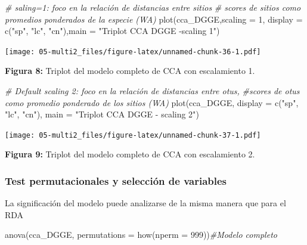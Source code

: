 \documentclass[
]{book}
\newenvironment{Shaded}{\begin{snugshade}}{\end{snugshade}}
\newcommand{\AttributeTok}[1]{\textcolor[rgb]{0.77,0.63,0.00}{#1}}
\newcommand{\CommentTok}[1]{\textcolor[rgb]{0.56,0.35,0.01}{\textit{#1}}}
\newcommand{\DecValTok}[1]{\textcolor[rgb]{0.00,0.00,0.81}{#1}}
\newcommand{\FunctionTok}[1]{\textcolor[rgb]{0.00,0.00,0.00}{#1}}
\newcommand{\NormalTok}[1]{#1}
\newcommand{\StringTok}[1]{\textcolor[rgb]{0.31,0.60,0.02}{#1}}
\begin{document}
\begin{Shaded}
\begin{Highlighting}[]
\CommentTok{\# saling=1: foco en la relación de distancias entre sitios}
\CommentTok{\# scores de sitios como promedios ponderados de la especie (WA)}
\FunctionTok{plot}\NormalTok{(cca\_DGGE,}\AttributeTok{scaling =} \DecValTok{1}\NormalTok{, }\AttributeTok{display =} \FunctionTok{c}\NormalTok{(}\StringTok{"sp"}\NormalTok{, }\StringTok{"lc"}\NormalTok{, }\StringTok{"cn"}\NormalTok{),}\AttributeTok{main =} \StringTok{"Triplot CCA DGGE {-}scaling 1"}\NormalTok{)}
\end{Highlighting}
\end{Shaded}

\texttt{[image: 05-multi2\_files/figure-latex/unnamed-chunk-36-1.pdf]}

\textbf{Figura 8:} Triplot del modelo completo de CCA con escalamiento 1.

\begin{Shaded}
\begin{Highlighting}[]
\CommentTok{\# Default scaling 2: foco en la relación de distancias entre otu\textquotesingle{}s, }
\CommentTok{\#scores de otu\textquotesingle{}s como promedio ponderado de los sitios (WA)}
\FunctionTok{plot}\NormalTok{(cca\_DGGE, }\AttributeTok{display =} \FunctionTok{c}\NormalTok{(}\StringTok{"sp"}\NormalTok{, }\StringTok{"lc"}\NormalTok{, }\StringTok{"cn"}\NormalTok{), }\AttributeTok{main =} \StringTok{"Triplot CCA DGGE {-} scaling 2"}\NormalTok{)}
\end{Highlighting}
\end{Shaded}

\texttt{[image: 05-multi2\_files/figure-latex/unnamed-chunk-37-1.pdf]}

\textbf{Figura 9:} Triplot del modelo completo de CCA con escalamiento 2.

\hypertarget{test-permutacionales-y-selecciuxf3n-de-variables}{%
\subsubsection{Test permutacionales y selección de variables}\label{test-permutacionales-y-selecciuxf3n-de-variables}}

La significación del modelo puede analizarse de la misma manera que para el RDA

\begin{Shaded}
\begin{Highlighting}[]
\FunctionTok{anova}\NormalTok{(cca\_DGGE, }\AttributeTok{permutations =} \FunctionTok{how}\NormalTok{(}\AttributeTok{nperm =} \DecValTok{999}\NormalTok{))}\CommentTok{\#Modelo completo}
\end{Highlighting}
\end{Shaded}
\end{document}
